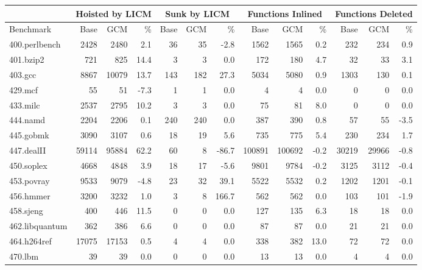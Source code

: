 \documentclass[acmlarge,review,anonymous]{acmart}\settopmatter{printfolios=true}
\begin{document}
\begin{table}[h!]
  \begin{center}
    \begin{tabular}{|l|r|r|r|r|r|r|r|r|r|r|r|r|}
      \hline
  &  \multicolumn{3}{|c|}{Hoisted by LICM} &\multicolumn{3}{|c|}{Sunk by LICM} &\multicolumn{3}{|c|}{Functions Inlined} &  \multicolumn{3}{|c|}{Functions Deleted} \\\hline
 Benchmark        & Base        & GCM	& \%  &Base     & GCM   &\%    & Base	& GCM	  &\%   & Base	& GCM	& \% \\\hline
 400.perlbench	  & 2428	& 2480	& 2.1 & 36	& 35	& -2.8 & 1562	& 1565	  & 0.2 & 232	& 234	& 0.9  \\\hline
 401.bzip2	  & 721	        & 825	& 14.4& 3	& 3	& 0.0  & 172	& 180	  & 4.7 & 32	& 33	& 3.1  \\\hline
 403.gcc	  & 8867	& 10079	& 13.7& 143	& 182	& 27.3 & 5034	& 5080	  & 0.9 & 1303	& 130	& 0.1  \\\hline
 429.mcf	  & 55	        & 51	& -7.3& 1	& 1	& 0.0  & 4	& 4	  & 0.0 & 0 	& 0	& 0.0  \\\hline
 433.milc	  & 2537	& 2795	& 10.2& 3	& 3	& 0.0  & 75	& 81	  & 8.0 & 0	& 0	& 0.0  \\\hline
 444.namd	  & 2204	& 2206	& 0.1 & 240	& 240	& 0.0  & 387	& 390	  & 0.8 & 57	& 55	& -3.5 \\\hline
 445.gobmk	  & 3090	& 3107	& 0.6 & 18	& 19	& 5.6  & 735	& 775	  & 5.4 & 230	& 234	& 1.7  \\\hline
 447.dealII	  & 59114	& 95884	& 62.2& 60	& 8	& -86.7& 100891& 100692  & -0.2& 30219	& 29966	& -0.8 \\\hline
 450.soplex	  & 4668	& 4848	& 3.9 & 18	& 17	& -5.6 & 9801	& 9784	  & -0.2& 3125	& 3112	& -0.4 \\\hline
 453.povray	  & 9533	& 9079	& -4.8& 23	& 32	& 39.1 & 5522	& 5532	  & 0.2 & 1202	& 1201	& -0.1 \\\hline
 456.hmmer	  & 3200	& 3232	& 1.0 & 3	& 8	& 166.7& 562	& 562	  & 0.0 & 103	& 101	& -1.9 \\\hline
 458.sjeng	  & 400	        & 446	& 11.5& 0	& 0	& 0.0  & 127	& 135	  & 6.3 & 18	& 18	& 0.0  \\\hline
 462.libquantum	  & 362	        & 386	& 6.6 & 0 	& 0	& 0.0  & 87	& 87	  & 0.0 & 21	& 21	& 0.0  \\\hline
 464.h264ref	  & 17075	& 17153	& 0.5 & 4	& 4	& 0.0  & 338	& 382	  & 13.0& 72	& 72	& 0.0  \\\hline
 470.lbm	  & 39	        & 39	& 0.0 & 0	& 0	& 0.0  & 13	& 13	  & 0.0 & 4	& 4	& 0.0  \\\hline

\end{tabular}
\end{center}
\end{table}
\end{document}

